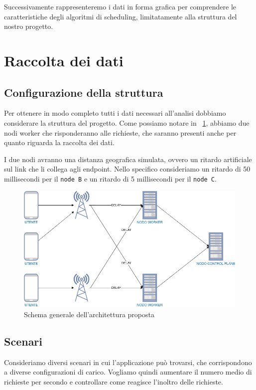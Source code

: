 \documentclass[12pt, hidelinks]{report}
\begin{document}
Successivamente rappresenteremo i dati in forma grafica per comprendere le caratteristiche degli algoritmi di scheduling, limitatamente alla struttura del nostro progetto.

\section{Raccolta dei dati}
\subsection{Configurazione della struttura}
Per ottenere in modo completo tutti i dati necessari all'analisi dobbiamo considerare la struttura del progetto. Come possiamo notare in \figurename~\ref{fig:schema-generale_res}, abbiamo due nodi worker che risponderanno alle richieste, che saranno presenti anche per quanto riguarda la raccolta dei dati.

I due nodi avranno una distanza geografica simulata, ovvero un ritardo artificiale sul link che li collega agli endpoint. Nello specifico consideriamo un ritardo di 50 millisecondi per il \texttt{node B} e un ritardo di 5 millisecondi per il \texttt{node C}.

\begin{figure}[h]
    \centering
    \includegraphics[width=\linewidth]{9_schema_generale.png}
    \caption{Schema generale dell'architettura proposta}
    \label{fig:schema-generale_res}
\end{figure}

\subsection{Scenari}
Consideriamo diversi scenari in cui l'applicazione può trovarsi, che corrispondono a diverse configurazioni di carico. Vogliamo quindi aumentare il numero medio di richieste per secondo e controllare come reagisce l'inoltro delle richieste.
\end{document}
